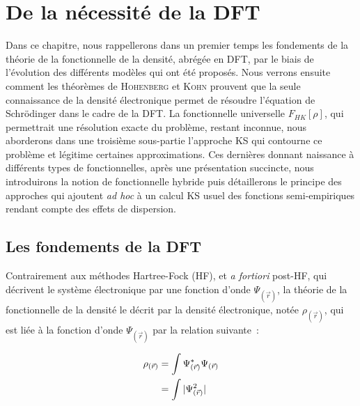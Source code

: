 \documentclass[12pt,a4paper]{book}
\begin{document}
	\section[DFT]{De la nécessité de la DFT}
	
	Dans ce chapitre, nous rappellerons dans un premier temps les fondements de la théorie de la fonctionnelle de la densité, abrégée en DFT, par le biais de l'évolution des différents modèles qui ont été proposés. Nous verrons ensuite comment les théorèmes de \textsc{Hohenberg} et \textsc{Kohn} prouvent que la seule connaissance de la densité électronique permet de résoudre l'équation de Schr\"{o}dinger dans le cadre de la DFT. La fonctionnelle universelle $F_{HK}[\rho]$, qui permettrait une résolution exacte du problème, restant inconnue, nous aborderons dans une troisième sous-partie l'approche KS qui contourne ce problème et légitime certaines approximations. Ces dernières donnant naissance à différents types de fonctionnelles, après une présentation succincte, nous introduirons la notion de fonctionnelle hybride puis détaillerons le principe des approches qui ajoutent \textit{ad hoc} à un calcul KS usuel des fonctions semi-empiriques rendant compte des effets de dispersion.
	
	\subsection{Les fondements de la DFT}
	
	Contrairement aux méthodes Hartree-Fock (HF), et \textit{a fortiori} post-HF, qui décrivent le système électronique par une fonction d'onde $\Psi_{(\vec{r})}$, la théorie de la fonctionnelle de la densité le décrit par la densité électronique, notée $\rho_{(\vec{r})}$, qui est liée à la fonction d'onde $\Psi_{(\vec{r})}$ par la relation suivante~:
	
	\begin{align}
	\rho_{(\vec{r})} &= \int \Psi_{(\vec{r})}^{*} \Psi_{(\vec{r})} \\
	&= \int |\Psi_{(\vec{r})}^{2}| \notag
	\end{align}
	
\end{document}
